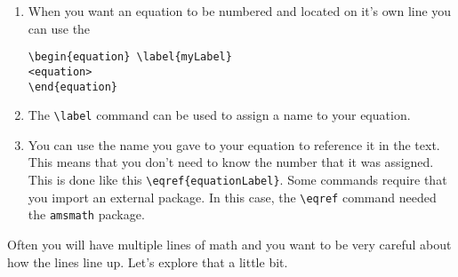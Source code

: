 \begin{enumerate}
\item When you want an equation to be numbered and located on it's own
  line you can use the 
\begin{Verbatim}
\begin{equation} \label{myLabel}
<equation>
\end{equation}
\end{Verbatim} 
\item The \verb!\label! command can be used to assign a name to your
  equation.
\item You can use the name you gave to your equation to reference it
  in the text.  This means that you don't need to know the number that
  it was assigned.  This is done like this
  \verb!\eqref{equationLabel}!. Some commands require that you import
  an external package.  In this case, the \verb!\eqref! command needed
  the \verb!amsmath! package.
\end{enumerate}

Often you will have multiple lines of math and you want to be very
careful about how the lines line up.  Let's explore that a little
bit.


